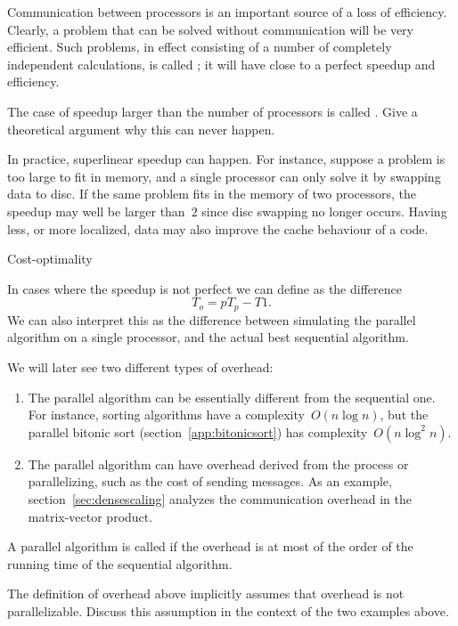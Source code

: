 Communication between processors is an important source of a loss of
efficiency. Clearly, a problem that can be solved without
communication will be very efficient. Such problems, in effect
consisting of a number of completely independent calculations, is
called ; it will have close to a perfect
speedup and efficiency.

\begin{exercise}
  The case of speedup larger than the number of processors is called
  . Give a theoretical argument why
  this can never happen.
\end{exercise}

In practice, superlinear speedup can happen. For instance, suppose a 
problem is too large to fit in memory, and a single processor can only
solve it by swapping data to disc. If the same problem fits in the
memory of two processors, the speedup may well be larger than~$2$
since disc swapping no longer occurs. Having less, or more localized,
data may also improve the cache behaviour of a code.

 {Cost-optimality}

In cases where the speedup is not perfect we can define
 as the difference \[ T_o = pT_p-T1. \]
We can also interpret this as the difference between simulating the
parallel algorithm on a single processor, and the actual best
sequential algorithm.

We will later see two different types of overhead:
\begin{enumerate}
\item The parallel algorithm can be essentially different from the
  sequential one. For instance, sorting algorithms have a
  complexity~$O(n\log n)$, but the parallel bitonic sort
  (section~\ref{app:bitonicsort}) has complexity~$O(n\log^2n)$.
\item The parallel algorithm can have overhead derived from the
  process or parallelizing, such as the cost of sending messages. As
  an example, section~\ref{sec:densescaling} analyzes the
  communication overhead in the matrix-vector product.
\end{enumerate}

A parallel algorithm is called  if the
overhead is at most of the order of the running time of the sequential
algorithm.

\begin{exercise}
  The definition of overhead above implicitly assumes that overhead is
  not parallelizable. Discuss this assumption in the context of the
  two examples above.
\end{exercise}

